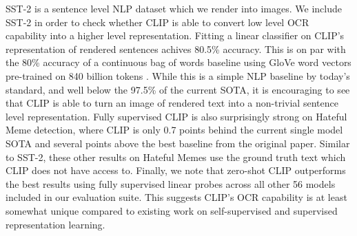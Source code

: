 \documentclass{article}
\begin{document}
SST-2 is a sentence level NLP dataset which we render into images. We include SST-2 in order to check whether CLIP is able to convert low level OCR capability into a higher level representation. Fitting a linear classifier on CLIP's representation of rendered sentences achives 80.5\% accuracy. This is on par with the 80\% accuracy of a continuous bag of words baseline using GloVe word vectors pre-trained on 840 billion tokens \citep{pennington2014glove}. While this is a simple NLP baseline by today's standard, and well below the 97.5\% of the current SOTA, it is encouraging to see that CLIP is able to turn an image of rendered text into a non-trivial sentence level representation. Fully supervised CLIP is also surprisingly strong on Hateful Meme detection, where CLIP is only 0.7 points behind the current single model SOTA and several points above the best baseline from the original paper. Similar to SST-2, these other results on Hateful Memes use the ground truth text which CLIP does not have access to. Finally, we note that zero-shot CLIP outperforms the best results using fully supervised linear probes across all other 56 models included in our evaluation suite. This suggests CLIP's OCR capability is at least somewhat unique compared to existing work on self-supervised and supervised representation learning.
\end{document}
